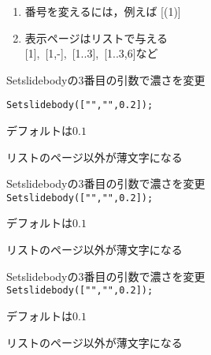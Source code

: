 \documentclass[landscape,10pt]{ujarticle}
\begin{document}
\sameslide

\vspace*{18mm}

\begin{enumerate}[(1)]
\item
番号を変えるには，例えば [(1)]
\item
表示ページはリストで与える\\
\hspace*{10mm}[1],\ [1,-],\ [1..3],\ [1..3,6]など
\end{enumerate}


\vspace*{18mm}

\begin{itemize}
{\color[cmyk]{\thin,\thin,\thin,\thin}
\item
Setslidebodyの3番目の引数で濃さを変更\\
}%
{\color[cmyk]{\thin,\thin,\thin,\thin}
\hspace*{10mm}\verb|Setslidebody(["","",0.2]);|
}%
{\color[cmyk]{\thin,\thin,\thin,\thin}
\item
デフォルトは$0.1$
}%
{\color[cmyk]{\thin,\thin,\thin,\thin}
\item
リストのページ以外が薄文字になる
}%
\end{itemize}



\sameslide

\vspace*{18mm}

\begin{itemize}
\item
Setslidebodyの3番目の引数で濃さを変更\\
\hspace*{10mm}\verb|Setslidebody(["","",0.2]);|
{\color[cmyk]{\thin,\thin,\thin,\thin}
\item
デフォルトは$0.1$
}%
{\color[cmyk]{\thin,\thin,\thin,\thin}
\item
リストのページ以外が薄文字になる
}%
\end{itemize}

\sameslide

\vspace*{18mm}

\begin{itemize}
\item
Setslidebodyの3番目の引数で濃さを変更\\
\hspace*{10mm}\verb|Setslidebody(["","",0.2]);|
\item
デフォルトは$0.1$
{\color[cmyk]{\thin,\thin,\thin,\thin}
\item
リストのページ以外が薄文字になる
}%
\end{itemize}
\end{document}
